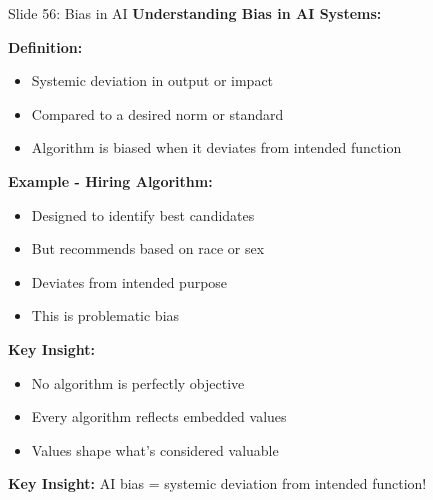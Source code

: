 \documentclass[8pt]{beamer}
\begin{document}
	
	\begin{frame}{Slide 56: Bias in AI}
		\fontsize{6.5}{7.5}\selectfont
		\textbf{Understanding Bias in AI Systems:}
		
		\vspace{0.1cm}
		\textbf{Definition:}
		\begin{itemize}
			\item Systemic deviation in output or impact
			\item Compared to a desired norm or standard
			\item Algorithm is biased when it deviates from intended function
		\end{itemize}
		
		\vspace{0.1cm}
		\textbf{Example - Hiring Algorithm:}
		\begin{itemize}
			\item Designed to identify best candidates
			\item But recommends based on race or sex
			\item Deviates from intended purpose
			\item This is problematic bias
		\end{itemize}
		
		\vspace{0.1cm}
		\textbf{Key Insight:}
		\begin{itemize}
			\item No algorithm is perfectly objective
			\item Every algorithm reflects embedded values
			\item Values shape what's considered valuable
		\end{itemize}
		
		\textcolor{myblue}{\textbf{Key Insight:}} AI bias = \textcolor{myblue}{systemic deviation from intended function}!
	\end{frame}
	
\end{document}
